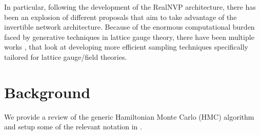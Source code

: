 \documentclass{article} %
\begin{document}
%
In particular, following the development of the RealNVP \citep{dinhRealNVP} architecture, there has been an explosion of
different proposals that aim to take advantage of the invertible network architecture.
%
Because of the enormous computational burden faced by generative techniques in lattice gauge theory, there have been
multiple works
\citep{%
   albergo2019flow,albergo2021introduction,favoni2020lattice,medvidovic2020generative,neklyudov2020orbital,
   neklyudov2020involutive, li2020neural,boyda2020sampling,kanwar2020equivariant,toth2019hamiltonian,
   hoffman2019neutra,wehenkel2020you,pasarica2010adaptively, dinhRealNVP,tanaka2017towards,schaefer2009investigating,
   cossu2018testing,rezende2020normalizing%
}, 
that look at developing more efficient sampling techniques specifically tailored for lattice gauge/field theories.
%
%
\section{\label{sec:background}Background}
We provide a review of the generic Hamiltonian Monte Carlo (HMC) algorithm and setup some of the relevant notation in
.
%
\end{document}
